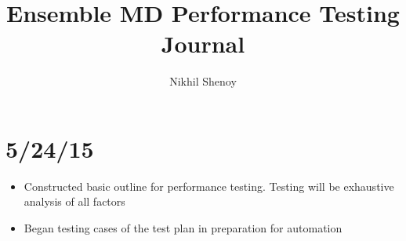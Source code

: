 \documentclass{article}
\title{Ensemble MD Performance Testing Journal}
\author{Nikhil Shenoy}
\begin{document}
	\maketitle
	\newpage

	\section{5/24/15}
	\begin{itemize}
		\item Constructed basic outline for performance testing. Testing will be exhaustive analysis of all factors
		\item Began testing cases of the test plan in preparation for automation
	\end{itemize}
\end{document}
